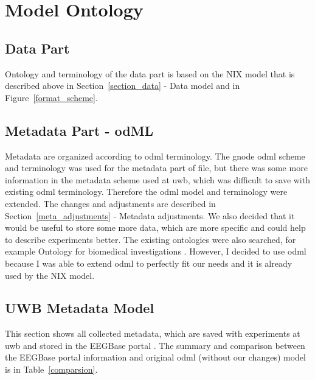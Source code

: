 \section{Model Ontology}
\subsection{Data Part}
Ontology and terminology of the data part is based on the NIX model that is described above in Section~\ref{section_data} - Data model and in Figure~\ref{format_scheme}.

\subsection{Metadata Part - odML}
\label{odml_section}
Metadata are organized according to \gls{odml} terminology. The \gls{gnode} \gls{odml} scheme and terminology was used for the metadata part of file, but there was some more information in the metadata scheme used at \gls{uwb}, which was difficult to save with existing \gls{odml} terminology. Therefore the \gls{odml} model and terminology were extended. The changes and adjustments are described in Section~\ref{meta_adjustments} - Metadata adjustments. We also decided that it would be useful to store some more data, which are more specific and could help to describe experiments better. The existing ontologies were also searched, for example Ontology for biomedical investigations \cite{oen} \cite{Brinkman2010}. However, I decided to use \gls{odml} because I was able to extend \gls{odml} to perfectly fit our needs and it is already used by the NIX model.


\subsection{UWB Metadata Model}
\label{meta_part}
This section shows all collected metadata, which are saved with experiments at \gls{uwb} and stored in the EEGBase portal \cite{eegportal}. The summary and comparison between the EEGBase portal information and original \gls{odml} (without our changes) model is in Table~\ref{comparsion}.


